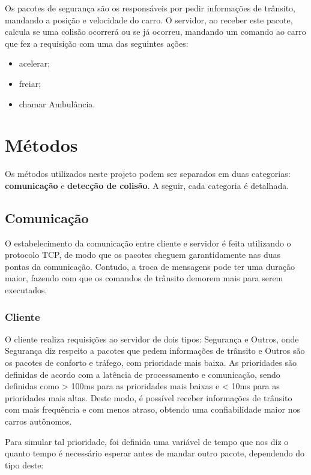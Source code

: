 \documentclass[10pt,twocolumn,letterpaper]{article}
\begin{document}
Os pacotes de segurança são os responsáveis por pedir informações de trânsito, mandando a posição e velocidade do carro. O servidor, ao receber este pacote, calcula se uma colisão ocorrerá ou se já ocorreu, mandando um comando ao carro que fez a requisição com uma das seguintes ações: 

\begin{itemize}
    \item acelerar; 
    \item freiar;
    \item chamar Ambulância.
\end{itemize}

\section{Métodos}
Os métodos utilizados neste projeto podem ser separados em duas categorias: \textbf{comunicação} e \textbf{detecção de colisão}. A seguir, cada categoria é detalhada.

\subsection{Comunicação}
    O estabelecimento da comunicação entre cliente e servidor é feita utilizando o protocolo TCP, de modo que os pacotes cheguem garantidamente nas duas pontas da comunicação. Contudo, a troca de mensagens pode ter uma duração maior, fazendo com que os comandos de trânsito demorem mais para serem executados.

    \subsubsection{Cliente}
        O cliente realiza requisições ao servidor de dois tipos: Segurança e Outros, onde Segurança diz respeito a pacotes que pedem informações de trânsito e Outros são os pacotes de conforto e tráfego, com prioridade mais baixa. As prioridades são definidas de acordo com a latência de processamento e comunicação, sendo definidas como > 100ms para as prioridades mais baixas e < 10ms para as prioridades mais altas. Deste modo, é possível receber informações de trânsito com mais frequência e com menos atraso, obtendo uma confiabilidade maior nos carros autônomos.
        
        Para simular tal prioridade, foi definida uma variável de tempo que nos diz o quanto tempo é necessário esperar antes de mandar outro pacote, dependendo do tipo deste:
\end{document}
